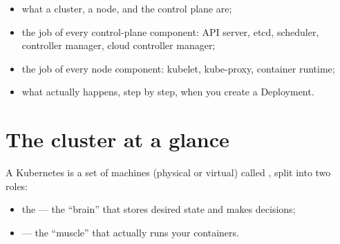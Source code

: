 
\begin{objectives}
\begin{itemize}
  \item what a cluster, a node, and the control plane are;
  \item the job of every control-plane component: API server, etcd,
        scheduler, controller manager, cloud controller manager;
  \item the job of every node component: kubelet, kube-proxy, container runtime;
  \item what actually happens, step by step, when you create a Deployment.
\end{itemize}
\end{objectives}

\section{The cluster at a glance}

A Kubernetes  is a set of machines (physical or virtual) called
, split into two roles:

\begin{itemize}
  \item the  --- the ``brain'' that stores desired state and
        makes decisions;
  \item {} --- the ``muscle'' that actually runs your containers.
\end{itemize}

